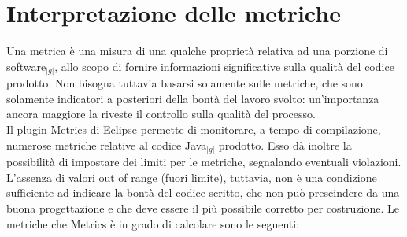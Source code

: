\section{Interpretazione delle metriche}{
\label{sec:Metriche}
    Una metrica è una misura di una qualche proprietà relativa ad una porzione di software$_{|g|}$, allo scopo di fornire informazioni significative sulla qualità del codice prodotto.
    Non bisogna tuttavia basarsi solamente sulle metriche, che sono solamente indicatori a posteriori della bontà del lavoro svolto: un’importanza ancora maggiore la riveste il controllo sulla qualità del processo.\\
    Il plugin Metrics di Eclipse permette di monitorare, a tempo di compilazione, numerose metriche relative al codice Java$_{|g|}$ prodotto. Esso dà inoltre la possibilità di impostare dei limiti 
    per le metriche, segnalando eventuali violazioni. L’assenza di valori out of range (fuori limite), tuttavia, non è una condizione sufficiente ad indicare la bontà del codice scritto, che non può prescindere da una buona progettazione e che deve essere il più possibile corretto per costruzione.
    Le metriche che Metrics è in grado di calcolare sono le seguenti:

}
